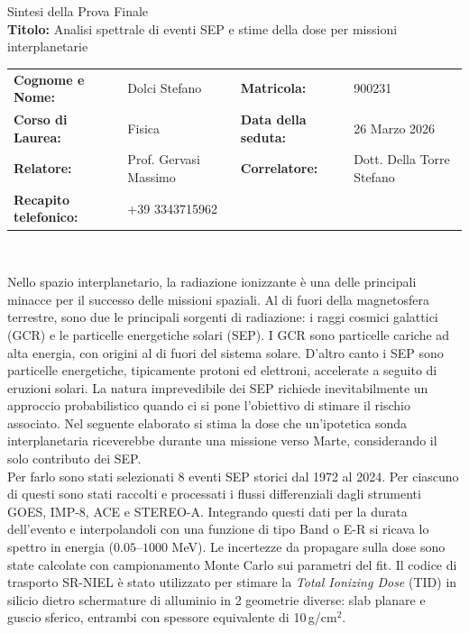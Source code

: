 \documentclass[a4paper,12pt]{article}
\begin{document}
\begin{center}
{\LARGE Sintesi della Prova Finale}\\[0.3cm]
\small
\textbf{Titolo:} Analisi spettrale di eventi SEP e stime della dose per missioni interplanetarie\\[8pt]
\begin{tabular}{ll@{\qquad}ll}
\textbf{Cognome e Nome:} & Dolci Stefano & \textbf{Matricola:} & 900231 \\
\textbf{Corso di Laurea:} & Fisica & \textbf{Data della seduta:} & 26 Marzo 2026 \\
\textbf{Relatore:} & Prof. Gervasi Massimo & \textbf{Correlatore:} & Dott. Della Torre Stefano \\
\textbf{Recapito telefonico:} & +39 3343715962 & & \\
\end{tabular}\\[0.2cm]
\end{center}
\vspace{0.2cm}
\noindent Nello spazio interplanetario, la radiazione ionizzante è una delle principali minacce per il successo delle missioni spaziali. Al di fuori della magnetosfera terrestre, sono due le principali sorgenti di radiazione: i raggi cosmici galattici (GCR) e le particelle energetiche solari (SEP). I GCR sono particelle cariche ad alta energia, con origini al di fuori del sistema solare. D'altro canto i SEP sono particelle energetiche, tipicamente protoni ed elettroni, accelerate a seguito di eruzioni solari. La natura imprevedibile dei SEP richiede inevitabilmente un approccio probabilistico quando ci si pone l'obiettivo di stimare il rischio associato. Nel seguente elaborato si stima la dose che un'ipotetica sonda interplanetaria riceverebbe durante una missione verso Marte, considerando il solo contributo dei SEP.\\
Per farlo sono stati selezionati 8 eventi SEP storici dal 1972 al 2024. Per ciascuno di questi sono stati raccolti e processati i flussi differenziali dagli strumenti GOES, IMP-8, ACE e STEREO-A. Integrando questi dati per la durata dell'evento e interpolandoli con una funzione di tipo Band o E-R si ricava lo spettro in energia ($0.05$--$1000$ MeV). Le incertezze da propagare sulla dose sono state calcolate con campionamento Monte Carlo sui parametri del fit. Il codice di trasporto SR-NIEL è stato utilizzato per stimare la \textit{Total Ionizing Dose} (TID) in silicio dietro schermature di alluminio in 2 geometrie diverse: slab planare e guscio sferico, entrambi con spessore equivalente di 10\,g/cm$^2$. 
\end{document}
